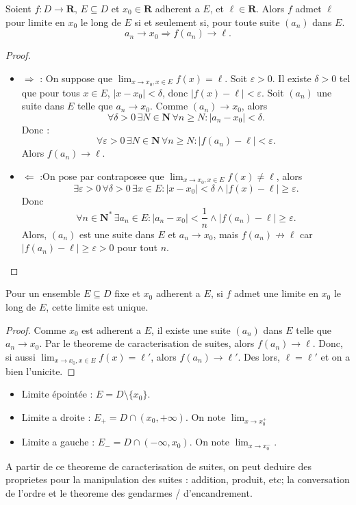\begin{theorem}
Soient $f:D\to \mathbf{R},\,E\subseteq D$ et $x_{0}\in \mathbf{R}$ adherent a $E$, et $\ell \in \mathbf{R}$. Alors $f$ admet $\ell$ pour limite en $x_{0}$ le long de $E$ si et seulement si, pour toute suite $(a_{n})$ dans $E$.
$$
a_{n}\to x_{0} \Rightarrow f(a_{n})\to \ell.
$$
\end{theorem}
\begin{proof}
\begin{itemize}
\item $\Rightarrow$ : On suppose que $\lim_{ x \to x_{0},x \in E }f(x)=\ell$. Soit $\varepsilon>0$. Il existe $\delta>0$ tel que pour tous $x \in E$, $|x-x_{0}|<\delta$, donc $|f(x)-\ell|<\varepsilon$. Soit $(a_{n})$ une suite dans $E$ telle que $a_{n}\to x_{0}$. Comme $(a_{n})\to x_{0}$, alors
$$
\forall \delta>0\, \exists N\in \mathbf{N}\, \forall n\ge N:|a_{n}-x_{0}|<\delta.
$$
Donc :
$$
		\forall\varepsilon>0\,\exists N\in \mathbf{N}\,\forall n\ge N:|f(a_{n})-\ell|<\varepsilon.
$$
Alors $f(a_{n})\to \ell$.
\item $\Leftarrow$ :On pose par contraposee que $\lim_{ x \to x_{0},x \in E }f(x)\neq \ell$, alors
$$
\exists\varepsilon>0\,\forall\delta>0\,\exists x \in E:|x-x_{0}|<\delta \land |f(x)-\ell|\ge \varepsilon.
$$
Donc
$$
\forall n\in \mathbf{N}^{*}\,\exists a_{n}\in E:|a_{n}-x_{0}|< \frac{1}{n}\land |f(a_{n})-\ell|\ge \varepsilon.
$$
Alors, $(a_{n})$ est une suite dans $E$ et $a_{n}\to x_{0}$, mais $f(a_{n})\not \to \ell$ car $|f(a_{n})-\ell|\ge \varepsilon>0$ pour tout $n$.
\end{itemize}
\end{proof}
\begin{corollary}
Pour un ensemble $E\subseteq D$ fixe et $x_{0}$ adherent a $E$, si $f$ admet une limite en $x_{0}$ le long de $E$, cette limite est unique.
\end{corollary}
\begin{proof}
Comme $x_{0}$ est adherent a $E$, il existe une suite $(a_{n})$ dans $E$ telle que $a_{n}\to x_{0}$. Par le theoreme de caracterisation de suites, alors $f(a_{n})\to \ell$. Donc, si aussi $\lim_{ x \to x_{0},x \in E }f(x)=\ell'$, alors $f(a_{n})\to \ell'$. Des lors, $\ell=\ell'$ et on a bien l'unicite.
\end{proof}
\begin{notation}
\begin{itemize}
\item Limite épointée : $E=D\setminus \{ x_{0} \}$.
\item Limite a droite : $E_{+}=D\cap(x_{0},+\infty)$. On note $\lim_{ x \to x_{0}^{+} }$
\item Limite a gauche : $E_{-}=D\cap(-\infty,x_{0})$. On note $\lim_{ x \to x_{0}^{-} }$.
\end{itemize}
\end{notation}
\begin{remark}
A partir de ce theoreme de caracterisation de suites, on peut deduire des proprietes pour la manipulation des suites : addition, produit, etc; la conversation de l'ordre et le theoreme des gendarmes / d'encandrement.
\end{remark}

